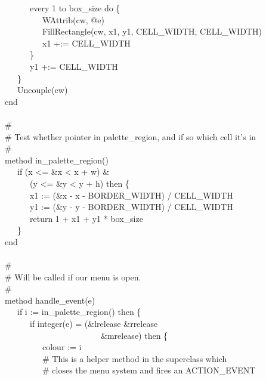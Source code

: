 {\>   \ \ \ \ \ \ every 1 to box\_size do \{ \\
\>   \ \ \ \ \ \ \ \ \ WAttrib(cw, @e) \\
\>   \ \ \ \ \ \ \ \ \ FillRectangle(cw, x1, y1, CELL\_WIDTH,
CELL\_WIDTH) \\
\>   \ \ \ \ \ \ \ \ \ x1 +:= CELL\_WIDTH \\
\>   \ \ \ \ \ \ \} \\
\>   \ \ \ \ \ \ y1 +:= CELL\_WIDTH \\
\>   \ \ \ \} \\
\>   \ \ \ Uncouple(cw) \\
\>   end \\
\ \\
\>   \# \\
\>   \# Test whether pointer in palette\_region, and if so which cell it's in \\
\>   \# \\
\>   method in\_palette\_region() \\
\>   \ \ \ if (x {\textless}= \&x {\textless} x + w) \& \\
\>   \ \ \ \ \ \ (y {\textless}= \&y {\textless} y + h)
then \{ \\
\>   \ \ \ \ \ \ x1 := (\&x - x - BORDER\_WIDTH) / CELL\_WIDTH \\
\>   \ \ \ \ \ \ y1 := (\&y - y - BORDER\_WIDTH) / CELL\_WIDTH \\
\>   \ \ \ \ \ \ return 1 + x1 + y1 * box\_size \\
\>   \ \ \ \} \\
\>   end \\
\ \\
\>   \# \\
\>   \# Will be called if our menu is open. \\
\>   \# \\
\>   method handle\_event(e) \\
\>   \ \ \ if i := in\_palette\_region() then \{ \\
\>   \ \ \ \ \ \ if integer(e) = (\&lrelease {\textbar} \&rrelease
{\textbar}  \\
\>   \ \ \ \ \ \ \ \ \ \ \ \ \ \ \ \ \ \ \ \ \ \ \ \&mrelease) then \{ \\
\>   \ \ \ \ \ \ \ \ \ colour := i \\
\>   \ \ \ \ \ \ \ \ \ \# This is a helper method in the superclass which \\
\>   \ \ \ \ \ \ \ \ \ \# closes the menu system and fires an ACTION\_EVENT \\
}
